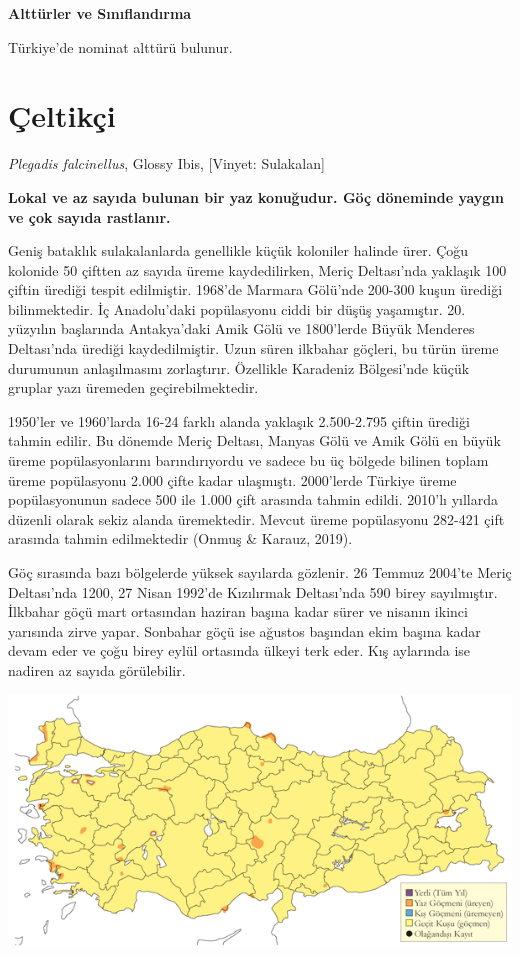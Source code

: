 \documentclass[
  a4paper,
  DIV=11,
  numbers=noendperiod]{scrreprt}
\begin{document}
\textbf{Alttürler ve Sınıflandırma}

Türkiye'de nominat alttürü bulunur.

\section{Çeltikçi}\label{uxe7eltikuxe7i}

\emph{Plegadis falcinellus}, Glossy Ibis, {[}Vinyet: Sulakalan{]}

\textbf{Lokal ve az sayıda bulunan bir yaz konuğudur. Göç döneminde
yaygın ve çok sayıda rastlanır.}

Geniş bataklık sulakalanlarda genellikle küçük koloniler halinde ürer.
Çoğu kolonide 50 çiftten az sayıda üreme kaydedilirken, Meriç
Deltası'nda yaklaşık 100 çiftin ürediği tespit edilmiştir. 1968'de
Marmara Gölü'nde 200-300 kuşun ürediği bilinmektedir. İç Anadolu'daki
popülasyonu ciddi bir düşüş yaşamıştır. 20. yüzyılın başlarında
Antakya'daki Amik Gölü ve 1800'lerde Büyük Menderes Deltası'nda ürediği
kaydedilmiştir. Uzun süren ilkbahar göçleri, bu türün üreme durumunun
anlaşılmasını zorlaştırır. Özellikle Karadeniz Bölgesi'nde küçük gruplar
yazı üremeden geçirebilmektedir.

1950'ler ve 1960'larda 16-24 farklı alanda yaklaşık 2.500-2.795 çiftin
ürediği tahmin edilir. Bu dönemde Meriç Deltası, Manyas Gölü ve Amik
Gölü en büyük üreme popülasyonlarını barındırıyordu ve sadece bu üç
bölgede bilinen toplam üreme popülasyonu 2.000 çifte kadar ulaşmıştı.
2000'lerde Türkiye üreme popülasyonunun sadece 500 ile 1.000 çift
arasında tahmin edildi. 2010'lı yıllarda düzenli olarak sekiz alanda
üremektedir. Mevcut üreme popülasyonu 282-421 çift arasında tahmin
edilmektedir (Onmuş \& Karauz, 2019).

Göç sırasında bazı bölgelerde yüksek sayılarda gözlenir. 26 Temmuz
2004'te Meriç Deltası'nda 1200, 27 Nisan 1992'de Kızılırmak Deltası'nda
590 birey sayılmıştır. İlkbahar göçü mart ortasından haziran başına
kadar sürer ve nisanın ikinci yarısında zirve yapar. Sonbahar göçü ise
ağustos başından ekim başına kadar devam eder ve çoğu birey eylül
ortasında ülkeyi terk eder. Kış aylarında ise nadiren az sayıda
görülebilir.

\includegraphics{images/harita_Page_062.png}
\end{document}
